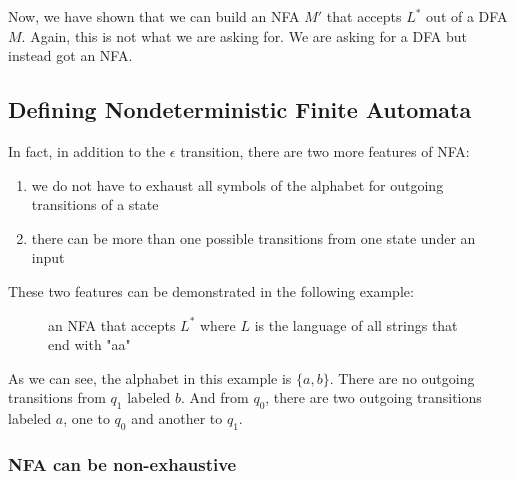 \documentclass[11pt]{article}
\begin{document}
Now, we have shown that we can build an NFA $M'$ that accepts $L^\ast$ out of
a DFA $M$. Again, this is not what we are asking for. We are asking for a DFA
but instead got an NFA.

\subsection{Defining Nondeterministic Finite Automata}

In fact, in addition to the $\epsilon$ transition, there are two more features
of NFA:
\begin{enumerate}
\item we do not have to exhaust all symbols of the alphabet for outgoing
transitions of a state
\item there can be more than one possible transitions from one state under an input
\end{enumerate}

These two features can be demonstrated in the following example:

\begin{figure}[ht]
    \centering
    \caption{an NFA that accepts $L^\ast$ where $L$ is the language of all
    strings that end with "aa"}
    \label{fig:fig11}
\end{figure}

As we can see, the alphabet in this example is $\{a,b\}$. There are no outgoing
transitions from $q_1$ labeled $b$. And from $q_0$, there are two outgoing
transitions labeled $a$, one to $q_0$ and another to $q_1$.

\subsubsection{NFA can be non-exhaustive}
\end{document}
